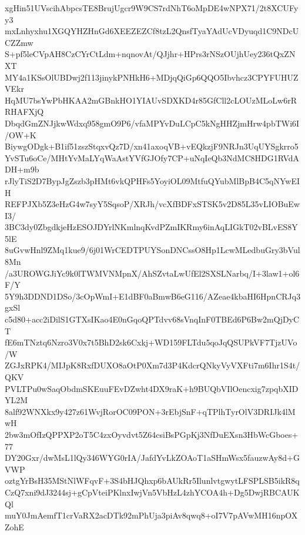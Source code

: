 xgHin51UVscihAbpcsTE8BrujUgcr9W9CS7rdNhT6oMpDE4wNPX71/2t8XCUFyy3
mxLnhyxhu1XGQYHZHnGd6XEEZEZCf8tzL2QnsfTyaYAdUcVDyuqd1C9NDcUCZZmw
S+pf5leCVpAH8CzCYrCtLdm+nqnovAt/QJjhr+HPrs3rNSzOUjhUey236tQxZNXT
MY4a1KSsOlUBDwj2f113jinykPNHkH6+MDjqQiGp6QQO5Ibvhcz3CPYFUHUZVEkr
HqMU7bsYwPbHKAA2mGBnkHO1YIAUvSDXKD4r85GfCll2cLOUzMLoLw6rRRHAFXjQ
DbqdGmZNJjkwWdxq958gmO9P6/vfaMPYvDuLCpC5kNgHHZjmHrw4pbTWi6I/OW+K
BiywgODgk+B1if51zszStqxvQz7D/xn41axoqVB+vEQkzjF9NRJn3UqUYSgkrro5
YvSTu6oCe/MHtYvMaLYqWaAstYVfGJOfy7CP+uNqIeQb3NdMC8HDG1RVdADH+m9b
rJlyTiS2D7BypJgZszb3pHMt6vkQPHFs5YoyiOL09MtfuQYubMlBpB4C5qNYwEIH
REFPJXb5Z3eHzG4w7syY5SqsoP/XRJh/vcXfBDFxSTSK5v2D85L35vLIOBuEwI3/
3BC3dy0ZbgdkjeHzESOJDYrlNKmlnqKvdPZmIKRmy6inAqLIGkT02vBLvES8Y5lE
8uGvwHnl9ZMq1kue9/6j01WrCEDTPUYSonDNCssO8Hp1LcwMLedbuGry3bVul8Mn
/a3UROWGJiYc9k0lTWMVNMpnX/AhSZvtaLwUfEl2SXSLNarbq/I+3law1+ol6F/Y
5Y9h3DDND1DSo/3cOpWmI+E1dBF0aBmwB6eG116/AZeae4kbaHI6HpnCRJq3gxSl
c5d80+acc2iDilS1GTXsIKao4E0nGqoQPTdvv68sVnqInF0TBEd6P6Bw2mQjDyCT
fE6mTNztq6Nzro3V0x7t5BhD2sk6Cxkj+WD159FLTdu5qoJqQSUPkVF7TjzUVo/W
ZGJxRPK4/MIJpK8RxfDUXO8aOtP0Xm7d3P4KdcrQNkyVyVXFti7m6Ihr1S4t/QKV
PVLTPu0wSaqObdmSKEuuFEvDZwht4DX9raK+h9BUQbVIlOencxig7zpqbXIDYL2M
8alf92WNXkx9y427z61WvjRorOC09PON+3rEbjSnF+qTPlhTyrOlV3DRIJk4lMwH
2bw3mOfIzQPPXP2oT5C4zxOyvdvt5Z64csiBsPGpKj3NfDuEXsn3HbWcGboes+77
DY20Gxr/dwMsL1lQy346WYG0rIA/JafdYvLkZOAoT1aSHmWsx5fauzwAy8d+GVWP
oztgYrBsH35MStNlWFqvF+3S4bHJQhxp6bAUkRr5IlunlvtgwytLFSPLSB5ikR8q
CzQ7xni9dJ3244sj+gCpVteiPKlnxIwjVn5VbHzL4zhYCOA4h+Dg5DwjRBCAUKQl
muY0JmAemfT1crVaRX2acDTk92mPhUja3piAv8qwq8+oI7V7pAVwMH16npOXZohE
